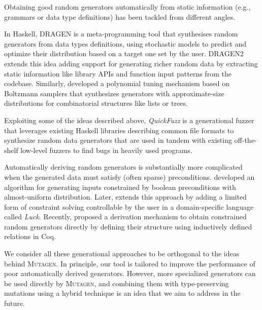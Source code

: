 \documentclass[sigconf, anonymous]{acmart}
\newcommand{\mutagen}{\textsc{Mutagen}\xspace}
\begin{document}
Obtaining good random generators automatically from static information (e.g.,
grammars or data type definitions) has been tackled from different angles.

In Haskell, DRAGEN \cite{DBLP:conf/haskell/MistaRH18} is a meta-programming tool
that synthesises random generators from data types definitions, using stochastic
models to predict and optimize their distribution based on a target one set by
the user.
%
DRAGEN2 \cite{Mista2019GeneratingRS} extends this idea adding support for
generating richer random data by extracting static information like library APIs
and function input patterns from the codebase.
%
Similarly, \cite{Bendkowski2017} developed a polynomial tuning mechanism based
on Boltzmann samplers \cite{Duchon2004} that synthesizes generators with
approximate-size distributions for combinatorial structures like lists or trees.

%
%
Exploiting some of the ideas described above, \emph{QuickFuzz} \cite{GriecoCB16,
  grieco2017} is a generational fuzzer that leverages existing Haskell libraries
describing common file formats to synthesize random data generators that are
used in tandem with existing off-the-shelf low-level fuzzers to find bugs in
heavily used programs.



Automatically deriving random generators is substantially more complicated when
the generated data must satisfy (often sparse) preconditions.
%
%
\citeauthor{ClaessenDP14} \citeyearpar{ClaessenDP14} developed an algorithm for
generating inputs constrained by boolean preconditions with almost-uniform
distribution.
%
%
Later, \citeauthor{LampropoulosGHH17} \citeyearpar{LampropoulosGHH17} extends
this approach by adding a limited form of constraint solving controllable by the
user in a domain-specific language called \emph{Luck}.
%
%
Recently, \citeauthor{Lampropoulos2017} \citeyearpar{Lampropoulos2017} proposed
a derivation mechanism to obtain constrained random generators directly by
defining their structure using inductively defined relations in Coq.



We consider all these generational approaches to be orthogonal to the ideas
behind \mutagen.
%
In principle, our tool is tailored to improve the performance of poor
automatically derived generators.
%
However, more specialized generators can be used directly by \mutagen, and
combining them with type-preserving mutations using a hybrid technique is an
idea that we aim to address in the future.
\end{document}
